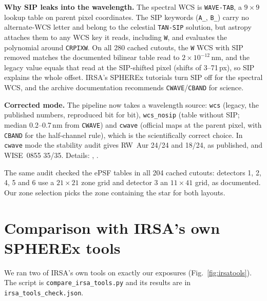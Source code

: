 \documentclass[11pt,a4paper]{article}
\begin{document}
\textbf{Why SIP leaks into the wavelength.} The spectral WCS is \texttt{WAVE-TAB}, a $9\times9$ lookup table on parent
pixel coordinates. The SIP keywords (\texttt{A\_}, \texttt{B\_}) carry no alternate-WCS letter and belong to the
celestial \texttt{TAN-SIP} solution, but astropy attaches them to any WCS key it reads, including \texttt{W}, and
evaluates the polynomial around \texttt{CRPIXW}. On all 280 cached cutouts, the \texttt{W} WCS with SIP removed matches
the documented bilinear table read to $2\times10^{-12}$\,nm, and the legacy value equals that read at the SIP-shifted
pixel (shifts of 3--71\,px), so SIP explains the whole offset. IRSA's SPHEREx tutorials turn SIP off for the spectral
WCS, and the archive documentation recommends \texttt{CWAVE}/\texttt{CBAND} for science.

\textbf{Corrected mode.} The pipeline now takes a wavelength source: \texttt{wcs} (legacy, the published numbers,
reproduced bit for bit), \texttt{wcs\_nosip} (table without SIP; median 0.2--0.7\,nm from \texttt{CWAVE}) and
\texttt{cwave} (official maps at the parent pixel, with \texttt{CBAND} for the half-channel rule), which is the
scientifically correct choice. In \texttt{cwave} mode the stability audit gives RW~Aur 24/24 and 18/24, as published,
and WISE~0855 35/35. Details:
, .

The same audit checked the ePSF tables in all 204 cached cutouts: detectors 1, 2, 4, 5 and 6 use a $21\times21$ zone
grid and detector 3 an $11\times41$ grid, as documented. Our zone selection picks the zone containing the star for
both layouts.

\section{Comparison with IRSA's own SPHEREx tools}\label{sec:irsatools}
We ran two of IRSA's own tools on exactly our exposures (Fig.~\ref{fig:irsatools}). The script is
\texttt{compare\_irsa\_tools.py} and its results are in \texttt{irsa\_tools\_check.json}.
\end{document}

